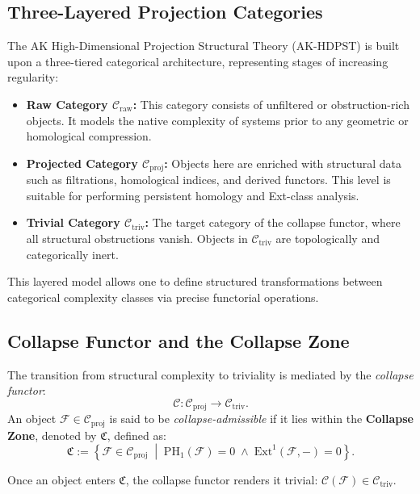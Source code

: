 \documentclass[11pt]{article}
\begin{document}
\subsection{Three-Layered Projection Categories}

The AK High-Dimensional Projection Structural Theory (AK-HDPST) is built upon a three-tiered categorical architecture, representing stages of increasing regularity:

\begin{itemize}
  \item \textbf{Raw Category \(\mathcal{C}_{\mathrm{raw}}\):}  
  This category consists of unfiltered or obstruction-rich objects. It models the native complexity of systems prior to any geometric or homological compression.

  \item \textbf{Projected Category \(\mathcal{C}_{\mathrm{proj}}\):}  
  Objects here are enriched with structural data such as filtrations, homological indices, and derived functors. This level is suitable for performing persistent homology and Ext-class analysis.

  \item \textbf{Trivial Category \(\mathcal{C}_{\mathrm{triv}}\):}  
  The target category of the collapse functor, where all structural obstructions vanish. Objects in \(\mathcal{C}_{\mathrm{triv}}\) are topologically and categorically inert.
\end{itemize}

This layered model allows one to define structured transformations between categorical complexity classes via precise functorial operations.

\subsection{Collapse Functor and the Collapse Zone}

The transition from structural complexity to triviality is mediated by the \emph{collapse functor}:
\[
\mathcal{C} : \mathcal{C}_{\mathrm{proj}} \to \mathcal{C}_{\mathrm{triv}}.
\]
An object \( \mathcal{F} \in \mathcal{C}_{\mathrm{proj}} \) is said to be \emph{collapse-admissible} if it lies within the \textbf{Collapse Zone}, denoted by \( \mathfrak{C} \), defined as:
\[
\mathfrak{C} := \left\{ \mathcal{F} \in \mathcal{C}_{\mathrm{proj}} \;\middle|\; \mathrm{PH}_1(\mathcal{F}) = 0 \;\wedge\; \mathrm{Ext}^1(\mathcal{F}, -) = 0 \right\}.
\]

Once an object enters \( \mathfrak{C} \), the collapse functor renders it trivial: \( \mathcal{C}(\mathcal{F}) \in \mathcal{C}_{\mathrm{triv}} \).
\end{document}
